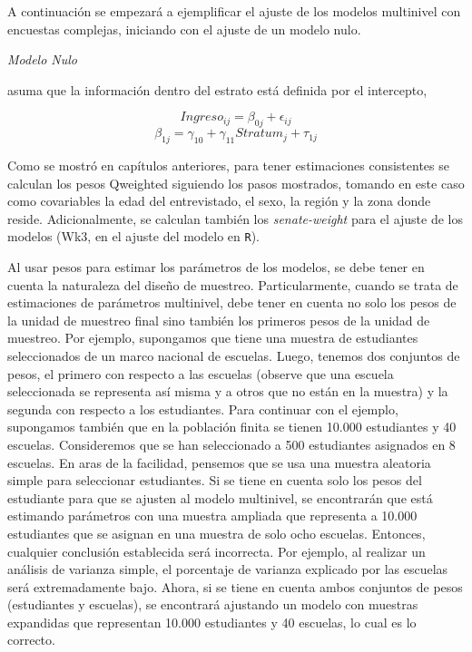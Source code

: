 \documentclass[
  12pt,
]{book}
\begin{document}
A continuación se empezará a ejemplificar el ajuste de los modelos multinivel con encuestas complejas, iniciando con el ajuste de un modelo nulo.

\emph{Modelo Nulo}

asuma que la información dentro del estrato está definida por el intercepto,

\[
Ingreso_{ij}=\beta_{0j}+\epsilon_{ij}
\]
\[
\beta_{1j} = \gamma_{10}+\gamma_{11}Stratum_{j} + \tau_{1j}
\]

Como se mostró en capítulos anteriores, para tener estimaciones consistentes se calculan los pesos Qweighted siguiendo los pasos mostrados, tomando en este caso como covariables la edad del entrevistado, el sexo, la región y la zona donde reside. Adicionalmente, se calculan también los \emph{senate-weight} para el ajuste de los modelos (Wk3, en el ajuste del modelo en \texttt{R}).

Al usar pesos para estimar los parámetros de los modelos, se debe tener en cuenta la naturaleza del diseño de muestreo. Particularmente, cuando se trata de estimaciones de parámetros multinivel, debe tener en cuenta no solo los pesos de la unidad de muestreo final sino también los primeros pesos de la unidad de muestreo. Por ejemplo, supongamos que tiene una muestra de estudiantes seleccionados de un marco nacional de escuelas. Luego, tenemos dos conjuntos de pesos, el primero con respecto a las escuelas (observe que una escuela seleccionada se representa así misma y a otros que no están en la muestra) y la segunda con respecto a los estudiantes. Para continuar con el ejemplo, supongamos también que en la población finita se tienen 10.000 estudiantes y 40 escuelas. Consideremos que se han seleccionado a 500 estudiantes asignados en 8 escuelas. En aras de la facilidad, pensemos que se usa una muestra aleatoria simple para seleccionar estudiantes. Si se tiene en cuenta solo los pesos del estudiante para que se ajusten al modelo multinivel, se encontrarán que está estimando parámetros con una muestra ampliada que representa a 10.000 estudiantes que se asignan en una muestra de solo ocho escuelas. Entonces, cualquier conclusión establecida será incorrecta. Por ejemplo, al realizar un análisis de varianza simple, el porcentaje de varianza explicado por las escuelas será extremadamente bajo. Ahora, si se tiene en cuenta ambos conjuntos de pesos (estudiantes y escuelas), se encontrará ajustando un modelo con muestras expandidas que representan 10.000 estudiantes y 40 escuelas, lo cual es lo correcto.
\end{document}
